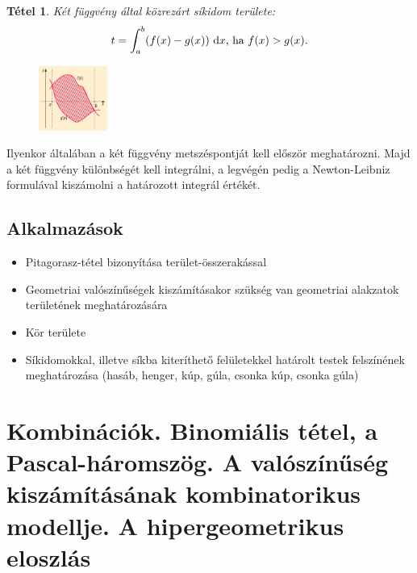 \documentclass[12pt,a4paper]{article}
\newtheorem{theorem}{Tétel} [section]
\begin{document}
\begin{theorem}
Két függvény által közrezárt síkidom területe:
$$t=\int_a^b(f(x)-g(x)) {\normalfont\text{ d}}x \text{, ha }f(x)>g(x).$$
\begin{figure}[h]
\centering
\includegraphics[width=0.2\textwidth]{alakzat_terulete_integral}
\end{figure}
\end{theorem}
Ilyenkor általában a két függvény metszéspontját kell először meghatározni. Majd a két függvény különbségét kell integrálni, a legvégén pedig a Newton-Leibniz formulával kiszámolni a határozott integrál értékét.

\subsection{Alkalmazások}
\begin{itemize}
\item Pitagorasz-tétel bizonyítása terület-összerakással
\item Geometriai valószínűségek kiszámításakor szükség van geometriai alakzatok területének meghatározására
\item Kör területe
\item  Síkidomokkal, illetve síkba kiteríthető felületekkel határolt testek felszínének meghatározása (hasáb, henger, kúp, gúla, csonka kúp, csonka gúla)
\end{itemize}
\newpage



\section{Kombinációk. Binomiális tétel, a Pascal-háromszög. A valószínűség kiszámításának kombinatorikus modellje. A hipergeometrikus eloszlás}
\end{document}
